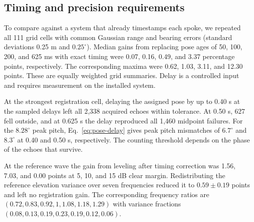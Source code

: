 \subsection{Timing and precision requirements}
To compare against a system that already timestamps each spoke, we repeated all 111 grid cells with common Gaussian range and bearing errors (standard deviations 0.25 m and $0.25^\circ$). Median gains from replacing pose ages of 50, 100, 200, and 625 ms with exact timing were 0.07, 0.16, 0.49, and 3.37 percentage points, respectively. The corresponding maxima were 0.62, 1.03, 3.11, and 12.30 points. These are equally weighted grid summaries. Delay is a controlled input and requires measurement on the installed system.

At the strongest registration cell, delaying the assigned pose by up to 0.40 s at the sampled delays left all 2,338 acquired echoes within tolerance. At 0.50 s, 627 fell outside, and at 0.625 s the delay reproduced all 1,460 midpoint failures. For the $8.28^\circ$ peak pitch, Eq.~\eqref{eq:pose-delay} gives peak pitch mismatches of $6.7^\circ$ and $8.3^\circ$ at 0.40 and 0.50 s, respectively. The counting threshold depends on the phase of the echoes that survive.

At the reference wave the gain from leveling after timing correction was 1.56, 7.03, and 0.00 points at 5, 10, and 15 dB clear margin. Redistributing the reference elevation variance over seven frequencies reduced it to $0.59\pm0.19$ points and left no registration gain. The corresponding frequency ratios are $(0.72,0.83,0.92,1,1.08,1.18,1.29)$ with variance fractions $(0.08,0.13,0.19,0.23,0.19,0.12,0.06)$.
